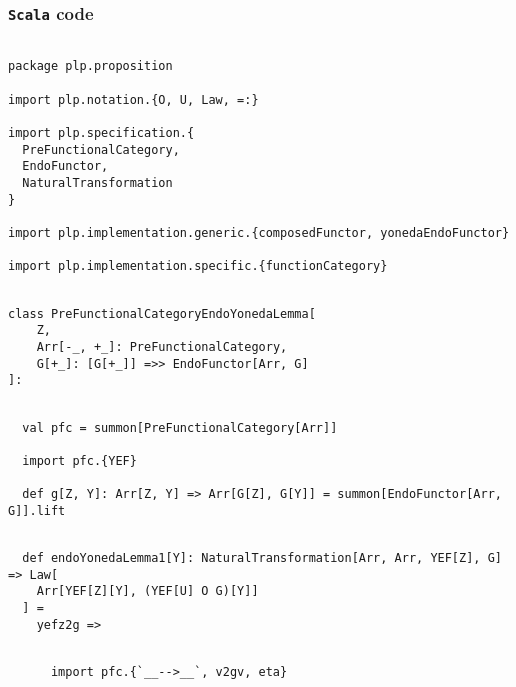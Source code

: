 \documentclass[11pt]{article}
\newcommand{\code}{\subsubsection{{\tt Scala} code}\begingroup\rm \vspace{12pt}}
\begin{document}
\code
\begin{mdframed}[backgroundcolor=lightgray!20] 
\begin{lstlisting}

package plp.proposition

import plp.notation.{O, U, Law, =:}

import plp.specification.{
  PreFunctionalCategory,
  EndoFunctor,
  NaturalTransformation
}

import plp.implementation.generic.{composedFunctor, yonedaEndoFunctor}

import plp.implementation.specific.{functionCategory}
\end{lstlisting}
\end{mdframed}
\vspace{6pt}
\begin{mdframed}[backgroundcolor=lightgray!20] 
\begin{lstlisting}

class PreFunctionalCategoryEndoYonedaLemma[
    Z,
    Arr[-_, +_]: PreFunctionalCategory,
    G[+_]: [G[+_]] =>> EndoFunctor[Arr, G]
]:
\end{lstlisting}
\end{mdframed}
\vspace{6pt}
\begin{mdframed}[backgroundcolor=lightgray!20] 
\begin{lstlisting}

  val pfc = summon[PreFunctionalCategory[Arr]]

  import pfc.{YEF}

  def g[Z, Y]: Arr[Z, Y] => Arr[G[Z], G[Y]] = summon[EndoFunctor[Arr, G]].lift
\end{lstlisting}
\end{mdframed}
\vspace{6pt}
\begin{mdframed}[backgroundcolor=lightgray!20] 
\begin{lstlisting}

  def endoYonedaLemma1[Y]: NaturalTransformation[Arr, Arr, YEF[Z], G] => Law[
    Arr[YEF[Z][Y], (YEF[U] O G)[Y]]
  ] =
    yefz2g =>
\end{lstlisting}
\end{mdframed}
\vspace{6pt}
\begin{mdframed}[backgroundcolor=lightgray!20] 
\begin{lstlisting}

      import pfc.{`__-->__`, v2gv, eta}
\end{lstlisting}
\end{mdframed}
\end{document}
